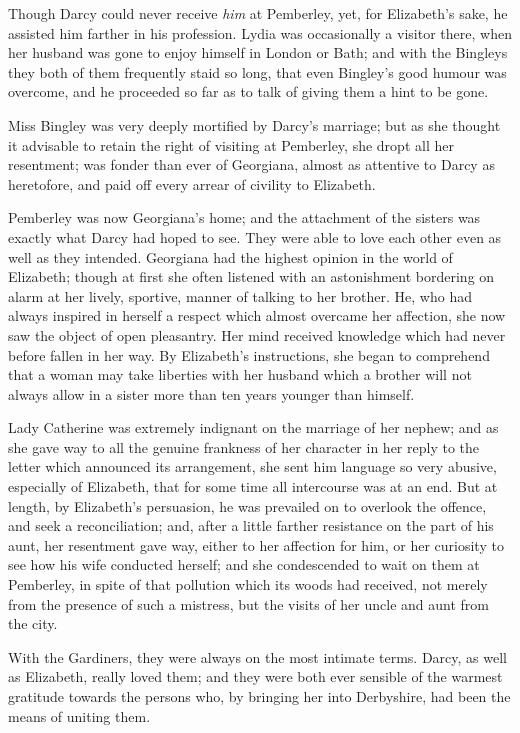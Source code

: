 \documentclass[12pt,english]{book}
\begin{document}
Though Darcy could never receive \textit{him} at Pemberley, yet, for
Elizabeth's sake, he assisted him farther in his profession. Lydia
was occasionally a visitor there, when her husband was gone to enjoy
himself in London or Bath; and with the Bingleys they both of them
frequently staid so long, that even Bingley's good humour was overcome,
and he proceeded so far as to talk of giving them a hint to be gone.

Miss Bingley was very deeply mortified by Darcy's marriage; but as
she thought it advisable to retain the right of visiting at Pemberley,
she dropt all her resentment; was fonder than ever of Georgiana, almost
as attentive to Darcy as heretofore, and paid off every arrear of
civility to Elizabeth.

Pemberley was now Georgiana's home; and the attachment of the sisters
was exactly what Darcy had hoped to see. They were able to love each
other even as well as they intended. Georgiana had the highest opinion
in the world of Elizabeth; though at first she often listened with
an astonishment bordering on alarm at her lively, sportive, manner
of talking to her brother. He, who had always inspired in herself
a respect which almost overcame her affection, she now saw the object
of open pleasantry. Her mind received knowledge which had never before
fallen in her way. By Elizabeth's instructions, she began to comprehend
that a woman may take liberties with her husband which a brother will
not always allow in a sister more than ten years younger than himself.

Lady Catherine was extremely indignant on the marriage of her nephew;
and as she gave way to all the genuine frankness of her character
in her reply to the letter which announced its arrangement, she sent
him language so very abusive, especially of Elizabeth, that for some
time all intercourse was at an end. But at length, by Elizabeth's
persuasion, he was prevailed on to overlook the offence, and seek
a reconciliation; and, after a little farther resistance on the part
of his aunt, her resentment gave way, either to her affection for
him, or her curiosity to see how his wife conducted herself; and she
condescended to wait on them at Pemberley, in spite of that pollution
which its woods had received, not merely from the presence of such
a mistress, but the visits of her uncle and aunt from the city.

With the Gardiners, they were always on the most intimate terms. Darcy,
as well as Elizabeth, really loved them; and they were both ever sensible
of the warmest gratitude towards the persons who, by bringing her
into Derbyshire, had been the means of uniting them. 
\end{document}
